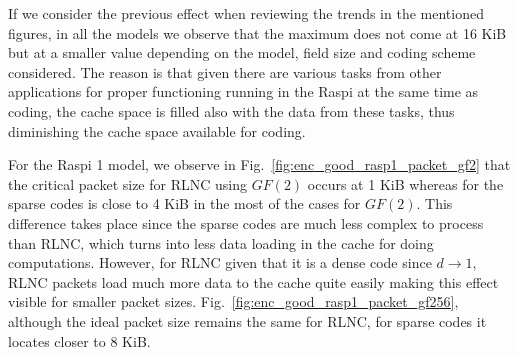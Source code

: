 If we consider the previous effect when reviewing the trends in the
mentioned figures, in all the models we observe that the maximum does not
come at 16 KiB but at a smaller value depending on the model, field size
and coding scheme considered. The reason is that given there are various
tasks from other applications for proper functioning running in the
\ac{Raspi} at the same time as coding, the cache space is filled also
with the data from these tasks, thus diminishing the cache space available
for coding.

For the \ac{Raspi} 1 model, we observe in
Fig.~\ref{fig:enc_good_rasp1_packet_gf2} that the critical
packet size for \ac{RLNC} using $GF(2)$ occurs at 1 KiB whereas for the
sparse codes is close to 4 KiB in the most of the cases for $GF(2)$. This
difference takes place since the sparse codes are much less complex to
process than \ac{RLNC}, which turns into less data loading in the
cache for doing computations. However, for \ac{RLNC} given that it is
a dense code since $d \to 1$, \ac{RLNC} packets load much more data to
the cache quite easily making this effect visible for smaller packet sizes.
Fig.~\ref{fig:enc_good_rasp1_packet_gf256}, although the ideal packet
size remains the same for \ac{RLNC}, for sparse codes it locates closer to
8 KiB.
%
